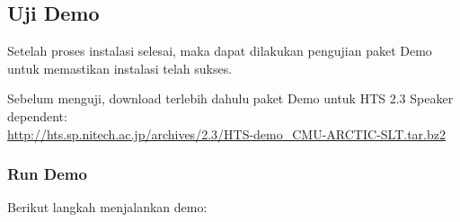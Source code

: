 \documentclass[12pt,]{article}
\begin{document}
	\subsection{Uji Demo}

	Setelah proses instalasi selesai, maka dapat dilakukan pengujian paket Demo untuk memastikan instalasi telah sukses.

	Sebelum menguji, download terlebih dahulu paket Demo untuk HTS 2.3 Speaker dependent:\\
	\url{http://hts.sp.nitech.ac.jp/archives/2.3/HTS-demo_CMU-ARCTIC-SLT.tar.bz2}

	\subsubsection{Run Demo}
	Berikut langkah menjalankan demo:
\end{document}
